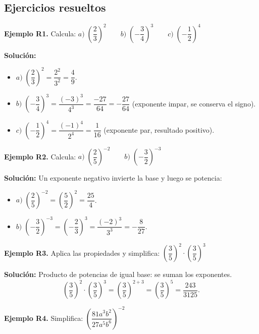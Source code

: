 \documentclass[12pt, letterpaper]{article}
\begin{document}
\subsection{Ejercicios resueltos}

\textbf{Ejemplo R1.} Calcula: $a) \; \left(\dfrac{2}{3}\right)^2 \qquad b) \; \left(-\dfrac{3}{4}\right)^3 \qquad c) \; \left(-\dfrac{1}{2}\right)^4$

\begin{cuadrosolucion}
  \textbf{Solución:}
  \begin{itemize}
    \item $a) \; \left(\dfrac{2}{3}\right)^2 = \dfrac{2^2}{3^2} = \dfrac{4}{9}$.
    \item $b) \; \left(-\dfrac{3}{4}\right)^3 = \dfrac{(-3)^3}{4^3} = \dfrac{-27}{64} = -\dfrac{27}{64}$ (exponente impar, se conserva el signo).
    \item $c) \; \left(-\dfrac{1}{2}\right)^4 = \dfrac{(-1)^4}{2^4} = \dfrac{1}{16}$ (exponente par, resultado positivo).
  \end{itemize}
\end{cuadrosolucion}

\textbf{Ejemplo R2.} Calcula: $a) \; \left(\dfrac{2}{5}\right)^{-2} \qquad b) \; \left(-\dfrac{3}{2}\right)^{-3}$

\begin{cuadrosolucion}
  \textbf{Solución:} Un exponente negativo invierte la base y luego se potencia:
  \begin{itemize}
    \item $a) \; \left(\dfrac{2}{5}\right)^{-2} = \left(\dfrac{5}{2}\right)^2 = \dfrac{25}{4}$.
    \item $b) \; \left(-\dfrac{3}{2}\right)^{-3} = \left(-\dfrac{2}{3}\right)^3 = \dfrac{(-2)^3}{3^3} = -\dfrac{8}{27}$.
  \end{itemize}
\end{cuadrosolucion}

\textbf{Ejemplo R3.} Aplica las propiedades y simplifica: $\left(\dfrac{3}{5}\right)^2 \cdot \left(\dfrac{3}{5}\right)^3$

\begin{cuadrosolucion}
  \textbf{Solución:} Producto de potencias de igual base: se suman los exponentes.
  $$\left(\frac{3}{5}\right)^2 \cdot \left(\frac{3}{5}\right)^3 = \left(\frac{3}{5}\right)^{2+3} = \left(\frac{3}{5}\right)^5 = \frac{243}{3125}.$$
\end{cuadrosolucion}

\textbf{Ejemplo R4.} Simplifica: $\left(\dfrac{81a^3b^2}{27a^5b^6}\right)^{-2}$
\end{document}
